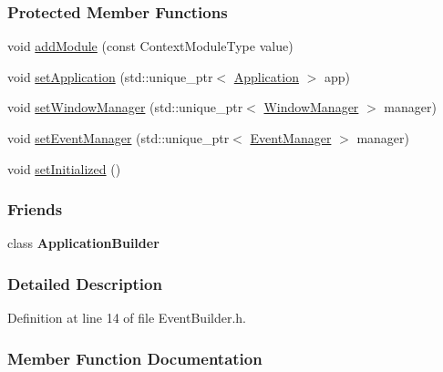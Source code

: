\subsubsection*{Protected Member Functions}
\begin{DoxyCompactItemize}
\item 
void \hyperlink{a00005_a52fb449fadc5d3a074e3fc7bfb56744b}{add\+Module} (const Context\+Module\+Type value)
\item 
void \hyperlink{a00005_a20c5dafa6892142bc352c13a5f3ac09a}{set\+Application} (std\+::unique\+\_\+ptr$<$ \hyperlink{a00002}{Application} $>$ app)
\item 
void \hyperlink{a00005_a641fb06484bdb07220f445f14db8c0e7}{set\+Window\+Manager} (std\+::unique\+\_\+ptr$<$ \hyperlink{a00087}{Window\+Manager} $>$ manager)
\item 
void \hyperlink{a00005_a52b490a3ef4d2a5b5b7e8e0f82d9a27c}{set\+Event\+Manager} (std\+::unique\+\_\+ptr$<$ \hyperlink{a00034}{Event\+Manager} $>$ manager)
\item 
void \hyperlink{a00005_af23e3bdfb30ca9f2076cacc9029d96c2}{set\+Initialized} ()
\end{DoxyCompactItemize}
\subsubsection*{Friends}
\begin{DoxyCompactItemize}
\item 
class {\bfseries Application\+Builder}\hypertarget{a00031_a8e3ef43d04dac530c01036fa6964e0f6}{}\label{a00031_a8e3ef43d04dac530c01036fa6964e0f6}

\end{DoxyCompactItemize}


\subsubsection{Detailed Description}


Definition at line 14 of file Event\+Builder.\+h.



\subsubsection{Member Function Documentation}
